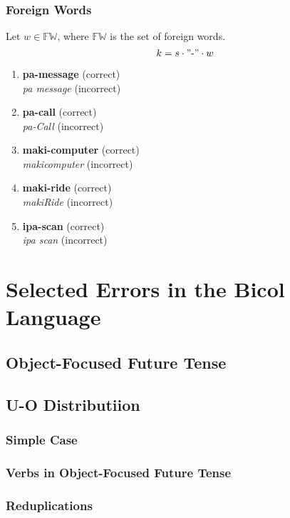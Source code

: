 \subsubsection{Foreign Words}
Let \(w \in \mathbb{FW}\), where \(\mathbb{FW}\) is the set of foreign words.
\[
      k = s \cdot "\text{-}" \cdot w
\]
\begin{example}
\end{example}
\begin{enumerate}
      \item \textbf{pa-message} (correct) \\
            \textit{pa message} (incorrect)
      \item \textbf{pa-call} (correct) \\
            \textit{pa-Call} (incorrect)
      \item \textbf{maki-computer} (correct) \\
            \textit{makicomputer} (incorrect)
      \item \textbf{maki-ride} (correct) \\
            \textit{makiRide} (incorrect)
      \item \textbf{ipa-scan} (correct) \\
            \textit{ipa scan} (incorrect)
\end{enumerate}

\section{Selected Errors in the Bicol Language}
\subsection{Object-Focused Future Tense}



\subsection{U-O Distributiion}
\subsubsection{Simple Case}
\subsubsection{Verbs in Object-Focused Future Tense}
\subsubsection{Reduplications}

